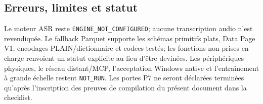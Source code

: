 \documentclass[11pt,a4paper]{report}
\begin{document}
\subsection{Erreurs, limites et statut}
Le moteur ASR reste \texttt{ENGINE\_NOT\_CONFIGURED}; aucune transcription audio n'est revendiquée. Le fallback Parquet supporte les schémas primitifs plats, Data Page V1, encodages PLAIN/dictionnaire et codecs testés; les fonctions non prises en charge renvoient un statut explicite au lieu d'être devinées. Les périphériques physiques, le réseau distant/MCP, l'acceptation Windows native et l'entraînement à grande échelle restent \texttt{NOT\_RUN}. Les portes P7 ne seront déclarées terminées qu'après l'inscription des preuves de compilation du présent document dans la checklist.
\end{document}
